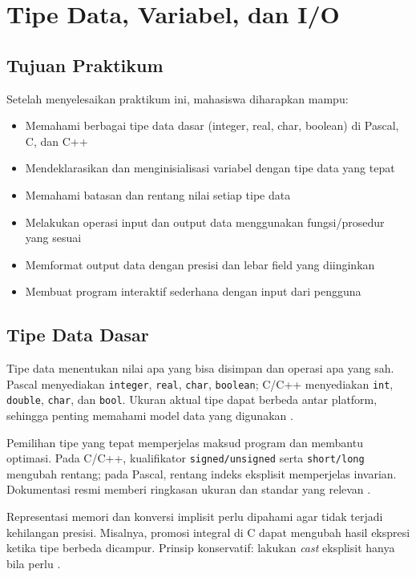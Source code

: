 \documentclass[../main.tex]{subfiles}
\begin{document}
\chapter{Tipe Data, Variabel, dan I/O}

\section*{Tujuan Praktikum}
Setelah menyelesaikan praktikum ini, mahasiswa diharapkan mampu:
\begin{itemize}
  \item Memahami berbagai tipe data dasar (integer, real, char, boolean) di Pascal, C, dan C++
  \item Mendeklarasikan dan menginisialisasi variabel dengan tipe data yang tepat
  \item Memahami batasan dan rentang nilai setiap tipe data
  \item Melakukan operasi input dan output data menggunakan fungsi/prosedur yang sesuai
  \item Memformat output data dengan presisi dan lebar field yang diinginkan
  \item Membuat program interaktif sederhana dengan input dari pengguna
\end{itemize}

\section{Tipe Data Dasar}
Tipe data menentukan nilai apa yang bisa disimpan dan operasi apa yang sah. Pascal menyediakan \texttt{integer}, \texttt{real}, \texttt{char}, \texttt{boolean}; C/C++ menyediakan \texttt{int}, \texttt{double}, \texttt{char}, dan \texttt{bool}. Ukuran aktual tipe dapat berbeda antar platform, sehingga penting memahami model data yang digunakan \parencite{pascal-tutorial-wikibooks,iso-c-draft-n1570,cpp-arithmetic-types,cpp-fundamental-types}.

Pemilihan tipe yang tepat memperjelas maksud program dan membantu optimasi. Pada C/C++, kualifikator \texttt{signed/unsigned} serta \texttt{short/long} mengubah rentang; pada Pascal, rentang indeks eksplisit memperjelas invarian. Dokumentasi resmi memberi ringkasan ukuran dan standar yang relevan \parencite{free-pascal-docs,iso-c-draft-n1570,cpp-reference}.

Representasi memori dan konversi implisit perlu dipahami agar tidak terjadi kehilangan presisi. Misalnya, promosi integral di C dapat mengubah hasil ekspresi ketika tipe berbeda dicampur. Prinsip konservatif: lakukan \emph{cast} eksplisit hanya bila perlu \parencite{gnu-c-manual,cpp-reference}.
\end{document}
